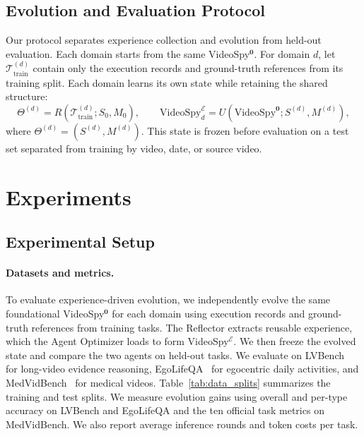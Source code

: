 \documentclass{article} %
\begin{document}
\subsection{Evolution and Evaluation Protocol}
\label{sec:evaluation_protocol}

Our protocol separates experience collection and evolution from held-out evaluation. Each domain starts from the same VideoSpy$^{\mathbf{0}}$. For domain $d$, let $\mathcal{T}_{\mathrm{train}}^{(d)}$ contain only the execution records and ground-truth references from its training split. Each domain learns its own state while retaining the shared structure:
\begin{equation}
\Theta^{(d)}=R(\mathcal{T}_{\mathrm{train}}^{(d)};S_0,M_0),
\qquad
\mathrm{VideoSpy}^{\mathcal{E}}_d=U(\mathrm{VideoSpy}^{\mathbf{0}};S^{(d)},M^{(d)}),
\end{equation}
where $\Theta^{(d)}=(S^{(d)},M^{(d)})$. This state is frozen before evaluation on a test set separated from training by video, date, or source video.

\section{Experiments}


\subsection{Experimental Setup}
\label{sec:experimental_setup}

\paragraph{Datasets and metrics.}
To evaluate experience-driven evolution, we independently evolve the same foundational VideoSpy$^{\mathbf{0}}$ for each domain using execution records and ground-truth references from training tasks. The Reflector extracts reusable experience, which the Agent Optimizer loads to form VideoSpy$^{\mathcal{E}}$. We then freeze the evolved state and compare the two agents on held-out tasks. We evaluate on LVBench~\citep{wang2025lvbench} for long-video evidence reasoning, EgoLifeQA~\citep{yang2025egolife} for egocentric daily activities, and MedVidBench~\citep{su2026medgrpo} for medical videos. Table~\ref{tab:data_splits} summarizes the training and test splits. We measure evolution gains using overall and per-type accuracy on LVBench and EgoLifeQA and the ten official task metrics on MedVidBench. We also report average inference rounds and token costs per task.
\end{document}
